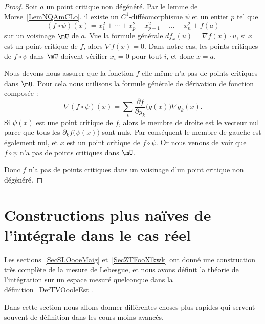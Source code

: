 \begin{proof}
    Soit \( a\) un point critique non dégénéré. Par le lemme de Morse~\ref{LemNQAmCLo}, il existe un \( C^1\)-difféomorphisme \( \psi\) et un entier \( p\) tel que
    \begin{equation}
        (f\circ \psi)(x)=x_1^2+\cdots +x_p^2-x_{p+1}^2-\ldots -x_n^2+f(a)
    \end{equation}
    sur un voisinage \( \mU\) de \( a\). Vue la formule générale \( df_x(u)=\nabla f(x)\cdot u\), si \( x\) est un point critique de \( f\), alors \( \nabla f(x)=0\). Dans notre cas, les points critiques de \( f\circ \psi\) dans \( \mU\) doivent vérifier \( x_i=0\) pour tout \( i\), et donc \( x=a\).

    Nous devons nous assurer que la fonction \( f\) elle-même n'a pas de points critiques dans \( \mU\). Pour cela nous utilisons la formule générale de dérivation de fonction composée :
    \begin{equation}
        \nabla(f\circ\psi)(x)=\sum_k \frac{ \partial f }{ \partial y_k }\big( g(x) \big)\nabla g_k(x).
    \end{equation}
    Si \( \psi(x)\) est une point critique de \( f\), alors le membre de droite est le vecteur nul parce que tous les \( \partial_kf\big( \psi(x) \big)\) sont nuls. Par conséquent le membre de gauche est également nul, et \( x\) est un point critique de \( f\circ\psi\). Or nous venons de voir que \( f\circ\psi\) n'a pas de points critiques dans \( \mU\).

    Donc \( f\) n'a pas de points critiques dans un voisinage d'un point critique non dégénéré.
\end{proof}

\section{Constructions plus naïves de l'intégrale dans le cas réel}

Les sections~\ref{SecSLOooeMaig} et~\ref{SecZTFooXlkwk} ont donné une construction très complète de la mesure de Lebesgue, et nous avons définit la théorie de l'intégration sur un espace mesuré quelconque dans la définition~\ref{DefTVOooleEst}.

Dans cette section nous allons donner différentes choses plus rapides qui servent souvent de définition dans les cours moins avancés.

